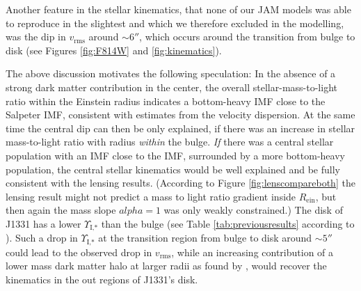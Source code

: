 Another feature in the stellar kinematics, that none of our JAM models was able to reproduce in the slightest and which we therefore excluded in the modelling, was the dip in $v_\text{rms}$ around $\sim 6''$, which occurs around the transition from bulge to disk (see Figures \ref{fig:F814W} and \ref{fig:kinematics}).

The above discussion motivates the following speculation: In the absence of a strong dark matter contribution in the center, the overall stellar-mass-to-light ratio within the Einstein radius indicates a bottom-heavy IMF close to the Salpeter IMF, consistent with estimates from the velocity dispersion. At the same time the central dip can then be only explained, if there was an increase in stellar mass-to-light ratio with radius \textit{within} the bulge. \emph{If} there was a central stellar population with an IMF close to the \citet{Chabrier2003} IMF, surrounded by a more bottom-heavy population, the central stellar kinematics would be well explained and be fully consistent with the lensing results. (According to Figure \ref{fig:lenscompareboth} the lensing result might not predict a mass to light ratio gradient inside $R_\text{ein}$, but then again the mass slope $alpha=1$ was only weakly constrained.) The disk of J1331 has a lower $\Upsilon_\text{I,*}$ than the bulge (see Table \ref{tab:previousresults} according to \citet{SWELLSI}). Such a drop in $\Upsilon_\text{I,*}$ at the transition region from bulge to disk around $\sim 5''$ could lead to the observed drop in $v_\text{rms}$, while an increasing contribution of a lower mass dark matter halo at larger radii as found by \citet{SWELLSV}, would recover the kinematics in the out regions of J1331's disk.


